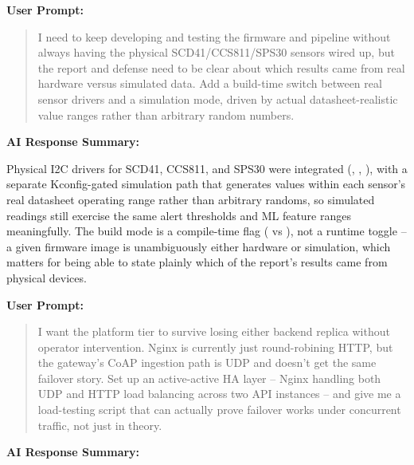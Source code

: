 \documentclass[conference]{IEEEtran}
\begin{document}
\noindent\textbf{User Prompt:}\par

\begin{quote}
I need to keep developing and testing the firmware and pipeline without always having the physical SCD41/CCS811/SPS30 sensors wired up, but the report and defense need to be clear about which results came from real hardware versus simulated data. Add a build-time switch between real sensor drivers and a simulation mode, driven by actual datasheet-realistic value ranges rather than arbitrary random numbers.
\end{quote}

\noindent\textbf{AI Response Summary:}\par

Physical I2C drivers for SCD41, CCS811, and SPS30 were integrated (\texttt{}, \texttt{}, \texttt{}), with a separate Kconfig-gated simulation path that generates values within each sensor's real datasheet operating range rather than arbitrary randoms, so simulated readings still exercise the same alert thresholds and ML feature ranges meaningfully. The build mode is a compile-time flag (\texttt{} vs \texttt{}), not a runtime toggle -- a given firmware image is unambiguously either hardware or simulation, which matters for being able to state plainly which of the report's results came from physical devices.

\par\vspace{4pt}\par\vspace{2pt}

\noindent\textbf{User Prompt:}\par

\begin{quote}
I want the platform tier to survive losing either backend replica without operator intervention. Nginx is currently just round-robining HTTP, but the gateway's CoAP ingestion path is UDP and doesn't get the same failover story. Set up an active-active HA layer -- Nginx handling both UDP and HTTP load balancing across two API instances -- and give me a load-testing script that can actually prove failover works under concurrent traffic, not just in theory.
\end{quote}

\noindent\textbf{AI Response Summary:}\par
\end{document}
